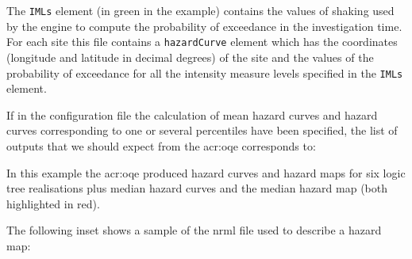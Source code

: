 The \texttt{IMLs} element (in green in the example) contains the values of
shaking used by the engine to compute the probability of exceedance in the
investigation time. For each site this file contains a \texttt{hazardCurve}
element which has the coordinates (longitude and latitude in decimal degrees)
of the site and the values of the probability of exceedance for all the
intensity measure levels specified in the \texttt{IMLs} element.

If in the configuration file the calculation of mean hazard curves and hazard
curves corresponding to one or several percentiles have been specified, the
list of outputs that we should expect from the \glsdesc{acr:oqe} corresponds
to:



In this example the \gls{acr:oqe} produced hazard curves and hazard maps for
six logic tree realisations plus median hazard curves and the median hazard
map (both highlighted in red).

The following inset shows a sample of the nrml file used to describe a hazard
map:

